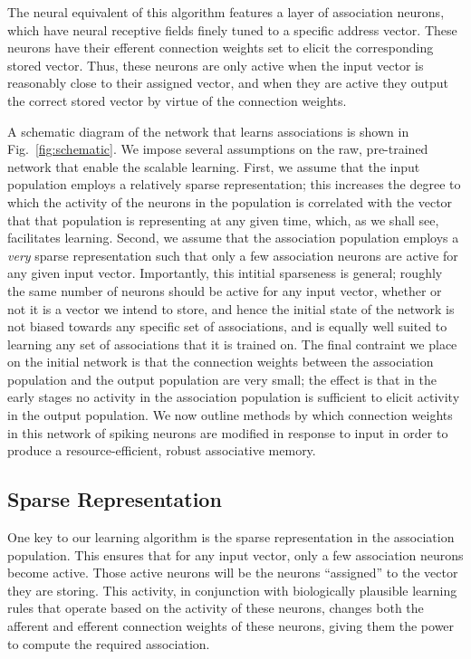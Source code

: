 \documentclass[10pt,letterpaper]{article}
\newcommand{\fg}{Fig.}
\begin{document}
The neural equivalent of this algorithm features a layer of association neurons, which have neural receptive fields finely tuned to a specific address vector. These neurons have their efferent connection weights set to elicit the corresponding stored vector. Thus, these neurons are only active when the input vector is reasonably close to their assigned vector, and when they are active they output the correct stored vector by virtue of the connection weights. 

A schematic diagram of the network that learns associations is shown in \fg~\ref{fig:schematic}. We impose several assumptions on the raw, pre-trained network that enable the scalable learning. First, we assume that the input population employs a relatively sparse representation; this increases the degree to which the activity of the neurons in the population is correlated with the vector that that population is representing at any given time, which, as we shall see, facilitates learning. Second, we assume that the association population employs a \textit{very} sparse representation such that only a few association neurons are active for any given input vector. Importantly, this intitial sparseness is general; roughly the same number of neurons should be active for any input vector, whether or not it is a vector we intend to store, and hence the initial state of the network is not biased towards any specific set of associations, and is equally well suited to learning any set of associations that it is trained on. The final contraint we place on the initial network is that the connection weights between the association population and the output population are very small; the effect is that in the early stages no activity in the association population is sufficient to elicit activity in the output population. We now outline methods by which connection weights in this network of spiking neurons are modified in response to input in order to produce a resource-efficient, robust associative memory.

\subsection{Sparse Representation}
One key to our learning algorithm is the sparse representation in the association population. This ensures that for any input vector, only a few association neurons become active. Those active neurons will be the neurons ``assigned'' to the vector they are storing. This activity, in conjunction with biologically plausible learning rules that operate based on the activity of these neurons, changes both the afferent and efferent connection weights of these neurons, giving them the power to compute the required association.
\end{document}
